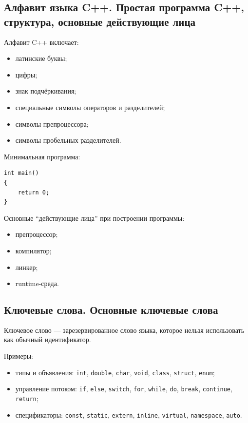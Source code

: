 \subsection{Алфавит языка C++. Простая программа C++, структура, основные действующие лица}

Алфавит C++ включает:
\begin{itemize}
    \item латинские буквы;
    \item цифры;
    \item знак подчёркивания;
    \item специальные символы операторов и разделителей;
    \item символы препроцессора;
    \item символы пробельных разделителей.
\end{itemize}

Минимальная программа:
\begin{verbatim}
int main()
{
    return 0;
}
\end{verbatim}

Основные ``действующие лица'' при построении программы:
\begin{itemize}
    \item препроцессор;
    \item компилятор;
    \item линкер;
    \item runtime-среда.
\end{itemize}


\subsection{Ключевые слова. Основные ключевые слова}

Ключевое слово --- зарезервированное слово языка, которое нельзя использовать как обычный идентификатор.

Примеры:
\begin{itemize}
    \item типы и объявления: \texttt{int}, \texttt{double}, \texttt{char}, \texttt{void}, \texttt{class}, \texttt{struct}, \texttt{enum};
    \item управление потоком: \texttt{if}, \texttt{else}, \texttt{switch}, \texttt{for}, \texttt{while}, \texttt{do}, \texttt{break}, \texttt{continue}, \texttt{return};
    \item спецификаторы: \texttt{const}, \texttt{static}, \texttt{extern}, \texttt{inline}, \texttt{virtual}, \texttt{namespace}, \texttt{auto}.
\end{itemize}


